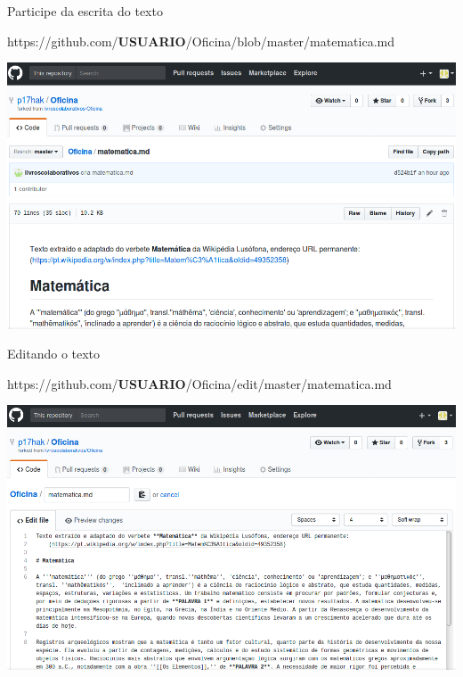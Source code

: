 \documentclass{beamer}
\begin{document}
\begin{frame}{Participe da escrita do texto}
  \begin{center}
    https://github.com/{\bf USUARIO}/Oficina/blob/master/matematica.md

    \includegraphics[scale=0.3]{./figs/matematica_GitHub.png}
  \end{center}
\end{frame}

\begin{frame}{Editando o texto}
  \begin{center}
    https://github.com/{\bf USUARIO}/Oficina/edit/master/matematica.md

    \includegraphics[scale=0.3]{./figs/editando_GitHub.png}
  \end{center}
\end{frame}
\end{document}
